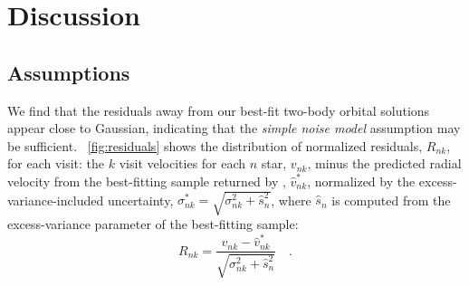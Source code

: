 \documentclass[modern, letterpaper]{aastex62}
\newcommand{\thejoker}{\project{The~Joker}}
\begin{document}



\section{Discussion}

\subsection{Assumptions}
\label{sec:discuss-assumptions}





We find that the residuals away from our best-fit two-body orbital solutions
appear close to Gaussian, indicating that the \emph{simple noise model}
assumption may be sufficient.
\figurename~\ref{fig:residuals} shows the distribution of normalized residuals,
$R_{nk}$, for each visit: the $k$ visit velocities for each $n$ star, $v_{nk}$,
minus the predicted radial velocity from the best-fitting sample returned by
\thejoker, $\hat{v}^*_{nk}$, normalized by the excess-variance-included
uncertainty, $\sigma_{nk}^* = \sqrt{\sigma_{nk}^2 + \hat{s}_{n}^2}$, where
$\hat{s}_{n}$ is computed from the excess-variance parameter of the best-fitting
sample:
\begin{equation}
    R_{nk} = \frac{v_{nk} - \hat{v}^*_{nk}}{\sqrt{\sigma_{nk}^2 +
    \hat{s}_{n}^2}} \quad . \label{eq:normresid}
\end{equation}
\end{document}
